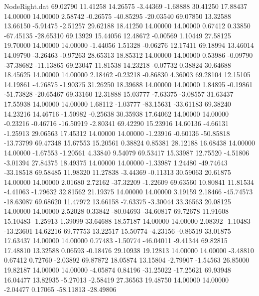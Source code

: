 \begin{filecontents}{NodeRight.dat}
  69.02790   11.41258   14.26575    -3.44369   -1.68888   30.41250   17.88437   14.00000   14.00000    2.58742   -0.26575  -40.85295  -20.03540
  69.07850   13.32588   13.66150    -5.91475   -2.51257   29.62188   18.41250   14.00000   14.00000    0.67412    0.33850  -67.45135  -28.65310
  69.13929   15.44056   12.48672    -0.00569    1.10449   27.58125   19.70000   14.00000   14.00000   -1.44056    1.51328   -0.06276   12.17411
  69.18994   13.46014   14.09790    -3.26463   -0.97263   28.65313   18.85312   14.00000   14.00000    0.53986   -0.09790  -37.38682  -11.13865
  69.23047   11.81538   14.23218    -0.07732    0.38824   30.64688   18.45625   14.00000   14.00000    2.18462   -0.23218   -0.86830    4.36003
  69.28104   12.15105   14.19861    -4.76875   -1.90375   31.26250   18.39688   14.00000   14.00000    1.84895   -0.19861  -51.73828  -20.65467
  69.33160   12.31888   15.03777    -7.63375   -3.08557   31.63437   17.55938   14.00000   14.00000    1.68112   -1.03777  -83.15631  -33.61183
  69.38240   14.23216   14.46716    -1.50982   -0.25638   30.35938   17.64062   14.00000   14.00000   -0.23216   -0.46716  -16.50919   -2.80341
  69.42290   15.23916   14.60136    -4.66131   -1.25913   29.06563   17.45312   14.00000   14.00000   -1.23916   -0.60136  -50.85818  -13.73799
  69.47348   15.67553   15.20561     0.38824    0.85381   28.12188   16.68438   14.00000   14.00000   -1.67553   -1.20561    4.33840    9.54079
  69.53417   15.33987   12.75520    -4.51806   -3.01394   27.84375   18.49375   14.00000   14.00000   -1.33987    1.24480  -49.74643  -33.18518
  69.58485   11.98320   11.27838    -3.44369   -0.11313   30.59063   20.61875   14.00000   14.00000    2.01680    2.72162  -37.32209   -1.22609
  69.63560   10.80841   11.81534    -4.41063   -1.79632   32.81562   21.19375   14.00000   14.00000    3.19159    2.18466  -45.74573  -18.63087
  69.68620   11.47972   13.66158    -7.63375   -3.30044   33.36563   20.08125   14.00000   14.00000    2.52028    0.33842  -80.04693  -34.60817
  69.72678   11.91608   15.10483    -1.25913    1.39099   33.64688   18.57187   14.00000   14.00000    2.08392   -1.10483  -13.23601   14.62216
  69.77753   13.22517   15.50774    -4.23156   -0.86519   33.01875   17.63437   14.00000   14.00000    0.77483   -1.50774  -46.04011   -9.41344
  69.82815   17.48810   13.32588     0.06593   -0.18476   29.10938   19.12813   14.00000   14.00000   -3.48810    0.67412    0.72760   -2.03892
  69.87872   18.05874   13.15804    -2.79907   -1.54563   26.85000   19.82187   14.00000   14.00000   -4.05874    0.84196  -31.25022  -17.25621
  69.93948   16.04477   13.82935    -5.27013   -2.58419   27.36563   19.48750   14.00000   14.00000   -2.04477    0.17065  -58.11813  -28.49806

\end{filecontents}
